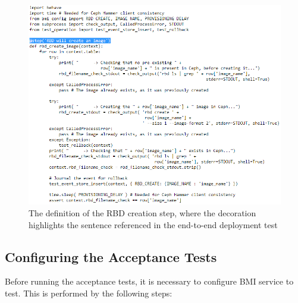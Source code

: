 \begin{figure}[!h] %
\begin{center}
\includegraphics[scale=1]{figures/bmi-bdd-step-definition-v3.png}
\end{center}
\caption{The definition of the RBD creation step, where the decoration highlights the sentence referenced in the end-to-end deployment test}
\label{fig:bdd-bmi-function-definition}
\end{figure}
\text{}\vspace{10mm}
\pagebreak

\subsection{Configuring the Acceptance Tests  \\ }

Before running the acceptance tests, it is necessary to configure BMI service to test.  This is performed by the following steps:

